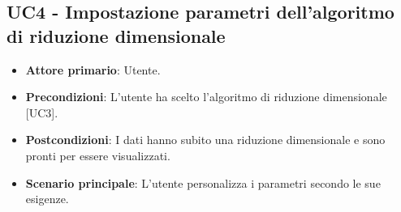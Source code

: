 \subsection{UC4 - Impostazione parametri dell'algoritmo di riduzione dimensionale}
\begin{itemize}
	\item \textbf{Attore primario}: Utente.
	\item \textbf{Precondizioni}: L'utente ha scelto l'algoritmo di riduzione dimensionale [UC3].
	\item \textbf{Postcondizioni}: I dati hanno subito una riduzione dimensionale e sono pronti per essere visualizzati.
	\item \textbf{Scenario principale}: L'utente personalizza i parametri secondo le sue esigenze.
\end{itemize}